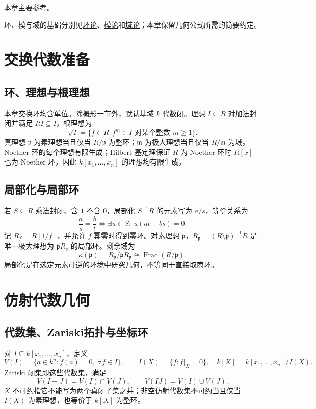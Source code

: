 \documentclass[../main.tex]{subfiles}
\begin{document}
本章主要参考\cite{milneAG,stacks}。

环、模与域的基础分别见\hyperref[chap:ring-theory]{环论}、\hyperref[chap:module-theory]{模论}和\hyperref[chap:field-theory]{域论}；本章保留几何公式所需的简要约定。
\section{交换代数准备}
\subsection{环、理想与根理想}
本章交换环均含单位。除概形一节外，默认基域 $k$ 代数闭。理想 $I\subseteq R$ 对加法封闭并满足 $RI\subseteq I$，根理想为
\[
\sqrt I=\{f\in R:f^m\in I\text{ 对某个整数 }m\ge1\}.
\]
真理想 $\mathfrak p$ 为素理想当且仅当 $R/\mathfrak p$ 为整环；$\mathfrak m$ 为极大理想当且仅当 $R/\mathfrak m$ 为域。
Noether 环的每个理想有限生成；Hilbert 基定理保证 $R$ 为 Noether 环时 $R[x]$ 也为 Noether 环，因此 $k[x_1,\ldots,x_n]$ 的理想均有限生成。
\subsection{局部化与局部环}
若 $S\subseteq R$ 乘法封闭、含 $1$ 不含 $0$，局部化 $S^{-1}R$ 的元素写为 $a/s$，等价关系为
\[
\frac as=\frac bt\iff\exists u\in S:\ u(at-bs)=0.
\]
记 $R_f=R[1/f]$，并允许 $f$ 幂零时得到零环。对素理想 $\mathfrak p$，$R_{\mathfrak p}=(R\setminus\mathfrak p)^{-1}R$ 是唯一极大理想为 $\mathfrak pR_{\mathfrak p}$ 的局部环。剩余域为
\[
\kappa(\mathfrak p)=R_{\mathfrak p}/\mathfrak pR_{\mathfrak p}
\cong\operatorname{Frac}(R/\mathfrak p).
\]
局部化是在选定元素可逆的环境中研究几何，不等同于直接取商环。
\section{仿射代数几何}
\subsection{代数集、Zariski拓扑与坐标环}
对 $I\subseteq k[x_1,\ldots,x_n]$，定义
\[
V(I)=\{a\in k^n:f(a)=0,\ \forall f\in I\},\qquad
I(X)=\{f:f|_X=0\},\quad k[X]=k[x_1,\ldots,x_n]/I(X).
\]
Zariski 闭集即这些代数集，满足
\[
V(I+J)=V(I)\cap V(J),\qquad V(IJ)=V(I)\cup V(J).
\]
$X$ 不可约指它不能写为两个真闭子集之并；非空仿射代数集不可约当且仅当 $I(X)$ 为素理想，也等价于 $k[X]$ 为整环。
\end{document}

